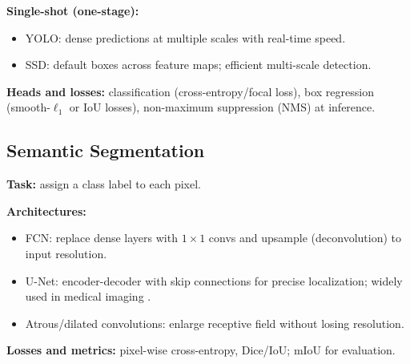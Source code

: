 \textbf{Single-shot (one-stage):}
\begin{itemize}
    \item YOLO: dense predictions at multiple scales with real-time speed.
    \item SSD: default boxes across feature maps; efficient multi-scale detection.
\end{itemize}

\textbf{Heads and losses:} classification (cross-entropy/focal loss), box regression (smooth-$\ell_1$ or IoU losses), non-maximum suppression (NMS) at inference.

\subsection{Semantic Segmentation}

\textbf{Task:} assign a class label to each pixel.

\textbf{Architectures:}
\begin{itemize}
    \item FCN: replace dense layers with $1\times1$ convs and upsample (deconvolution) to input resolution.
    \item U-Net: encoder-decoder with skip connections for precise localization; widely used in medical imaging \cite{Ronneberger2015}.
    \item Atrous/dilated convolutions: enlarge receptive field without losing resolution.
\end{itemize}

\textbf{Losses and metrics:} pixel-wise cross-entropy, Dice/IoU; mIoU for evaluation.
